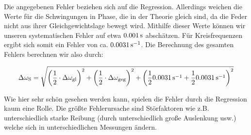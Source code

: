 Die angegebenen Fehler beziehen sich auf die Regression. Allerdings weichen die Werte für die Schwingungen in Phase, die in der Theorie gleich sind, da die Feder nicht aus ihrer Gleichgewichtslage bewegt wird. Mithilfe dieser Werte können wir unseren systematischen Fehler auf etwa $\unit[0.001]{s}$ abschätzen. Für Kreisfrequenzen ergibt sich somit ein Fehler von ca. $\unit[0.0031]{s^{-1}}$. Die Berechnung des gesamten Fehlers berechnen wir also durch:

\begin{equation*}
\Delta \omega_\n{S} = \sqrt{
\left(\frac{1}{2} \cdot \Delta\omega_\n{gl}\right)^2
+ 
\left(\frac{1}{2} \cdot \Delta\omega_\n{geg}\right)^2
+
\left(\frac12 \unit[0.0031]{s^{-1}} + \frac12 \unit[0.0031]{s^{-1}} \right)^2
}
\end{equation*}

Wie hier sehr schön gesehen werden kann, spielen die Fehler durch die Regression kaum eine Rolle. Die größte Fehlerursache sind Störfaktoren wie z.B. unterschiedlich starke Reibung (durch unterschiedlich große Auslenkung usw.) welche sich in unterschiedlichen Messungen ändern.



